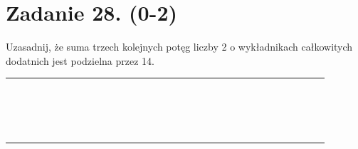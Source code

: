 \documentclass[10pt]{article}
\begin{document}
\section*{Zadanie 28. (0-2)}
Uzasadnij, że suma trzech kolejnych potęg liczby 2 o wykładnikach całkowitych dodatnich jest podzielna przez 14.

\begin{center}
\begin{tabular}{|c|c|c|c|c|c|c|c|c|c|c|c|c|c|c|c|c|c|c|c|c|c|c|c|c|c|c|c|c|c|c|c|}
\hline
 &  &  &  &  &  &  &  &  &  &  &  &  &  &  &  &  &  &  &  &  &  &  &  &  &  &  &  &  &  &  &  \\
\hline
 &  &  &  &  &  &  &  &  &  &  &  &  &  &  &  &  &  &  &  &  &  &  &  &  &  &  &  &  &  &  &  \\
\hline
 &  &  &  &  &  &  &  &  &  &  &  &  &  &  &  &  &  &  &  &  &  &  &  &  &  &  &  &  &  &  &  \\
\hline
 &  &  &  &  &  &  &  &  &  &  &  &  &  &  &  &  &  &  &  &  &  &  &  &  &  &  &  &  &  &  &  \\
\hline
 &  &  &  &  &  &  &  &  &  &  &  &  &  &  &  &  &  &  &  &  &  &  &  &  &  &  &  &  &  &  &  \\
\hline
 &  &  &  &  &  &  &  &  &  &  &  &  &  &  &  &  &  &  &  &  &  &  &  &  &  &  &  &  &  &  &  \\
\hline
 &  &  &  &  &  &  &  &  &  &  &  &  &  &  &  &  &  &  &  &  &  &  &  &  &  &  &  &  &  &  &  \\
\hline
 &  &  &  &  &  &  &  &  &  &  &  &  &  &  &  &  &  &  &  &  &  &  &  &  &  &  &  &  &  &  &  \\
\hline
 &  &  &  &  &  &  &  &  &  &  &  &  &  &  &  &  &  &  &  &  &  &  &  &  &  &  &  &  &  &  &  \\
\hline
 &  &  &  &  &  &  &  &  &  &  &  &  &  &  &  &  &  &  &  &  &  &  &  &  &  &  &  &  &  &  &  \\
\hline
 &  &  &  &  &  &  &  &  &  &  &  &  &  &  &  &  &  &  &  &  &  &  &  &  &  &  &  &  &  &  &  \\
\hline
 &  &  &  &  &  &  &  &  &  &  &  &  &  &  &  &  &  &  &  &  &  &  &  &  &  &  &  &  &  &  &  \\
\hline
 &  &  &  &  &  &  &  &  &  &  &  &  &  &  &  &  &  &  &  &  &  &  &  &  &  &  &  &  &  &  &  \\
\hline
 &  &  &  &  &  &  &  &  &  &  &  &  &  &  &  &  &  &  &  &  &  &  &  &  &  &  &  &  &  &  &  \\
\hline
 &  &  &  &  &  &  &  &  &  &  &  &  &  &  &  &  &  &  &  &  &  &  &  &  &  &  &  &  &  &  &  \\
\hline
 &  &  &  &  &  &  &  &  &  &  &  &  &  &  &  &  &  &  &  &  &  &  &  &  &  &  &  &  &  &  &  \\
\hline
 &  &  &  &  &  &  &  &  &  &  &  &  &  &  &  &  &  &  &  &  &  &  &  &  &  &  &  &  &  &  &  \\
\hline
 &  &  &  &  &  &  &  &  &  &  &  &  &  &  &  &  &  &  &  &  &  &  &  &  &  &  &  &  &  &  &  \\
\hline
\end{tabular}
\end{center}
\end{document}
